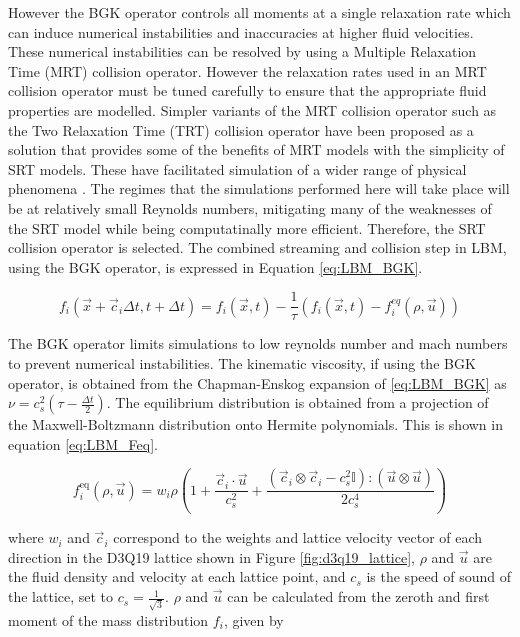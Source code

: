 However the BGK operator controls all moments at a single relaxation rate which can induce numerical instabilities and inaccuracies
at higher fluid velocities. \cite{liu_simulation_2023, adhikari_fluctuating_2005} These numerical instabilities can be resolved by using
a Multiple Relaxation Time (MRT) collision operator. However the relaxation rates used in an MRT collision operator must be tuned carefully
to ensure that the appropriate fluid properties are modelled. Simpler variants of the MRT collision operator such as the Two Relaxation Time (TRT)
collision operator have been proposed as a solution that provides some of the benefits of MRT models with the simplicity of SRT models. These 
have facilitated simulation of a wider range of physical phenomena \cite{adhikari_fluctuating_2005, liu_simulation_2023}. The regimes that the simulations 
performed here will take place will be at relatively small Reynolds numbers, mitigating many of the weaknesses of the SRT model while being computatinally
more efficient. Therefore, the SRT collision operator is selected. The combined streaming and 
collision step in LBM, using the BGK operator, is expressed in Equation \ref{eq:LBM_BGK}.

\begin{equation}
    f_{i}(\vec{x} + \vec{c}_{i}\Delta t, t + \Delta t) = f_{i}(\vec{x}, t) - \frac{1}{\tau}(f_{i}(\vec{x}, t) 
    - f_{i}^{eq}(\rho, \vec{u}))
    \label{eq:LBM_BGK}
\end{equation}

The BGK operator limits simulations to low reynolds number and mach numbers to prevent numerical instabilities. 
\cite{qian_lattice_1992} The kinematic viscosity, if using the BGK operator, is obtained from the Chapman-Enskog expansion of \ref{eq:LBM_BGK}
as $\nu = c_s^2(\tau - \frac{\Delta t}{2})$. The equilibrium distribution is obtained from a projection of the 
Maxwell-Boltzmann distribution onto Hermite polynomials. \cite{he_theory_1997, succi_lattice_2018} This is shown in equation 
\ref{eq:LBM_Feq}.

\begin{equation}
    f_i^{\text{eq}}(\rho, \vec{u}) = w_i \rho \left( 1 + \frac{\vec{c}_i \cdot \vec{u}}{c_s^2} + \frac{(\vec{c}_i \otimes \vec{c}_i - c_s^2 \mathbb{I}) : (\vec{u} \otimes \vec{u})}{2c_s^4} \right)
    \label{eq:LBM_Feq}
\end{equation}

where $w_i$ and $\vec{c}_i$ correspond to the weights and lattice velocity vector of each direction in the D3Q19 lattice shown in Figure \ref{fig:d3q19_lattice}, $\rho$ and $\vec{u}$ are the fluid density
and velocity at each lattice point, and $c_s$ is the speed of sound of the lattice, set to $c_s = \frac{1}{\sqrt{3}}$. $\rho$ and $\vec{u}$ can be calculated from the zeroth and first moment of the 
mass distribution $f_i$, given by 

